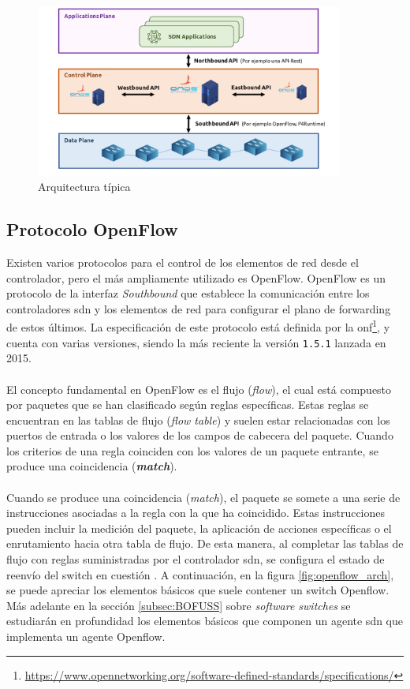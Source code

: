 \begin{figure}[ht]
    \centering
    \includegraphics[width=0.9\textwidth]{archivos/img/teoria/sdn_arch.png}
    \caption{Arquitectura típica  \cite{carrascal2020diseno}}
    \label{fig:sdnBasicArch}
\end{figure}


\subsection{Protocolo OpenFlow}

Existen varios protocolos para el control de los elementos de red desde el controlador, pero el más ampliamente utilizado es OpenFlow. OpenFlow es un protocolo de la interfaz \textit{Southbound} que establece la comunicación entre los controladores \gls{sdn} y los elementos de red para configurar el plano de forwarding de estos últimos. La especificación de este protocolo está definida por la \gls{onf}\footnote{\url{https://www.opennetworking.org/software-defined-standards/specifications/}}, y cuenta con varias versiones, siendo la más reciente la versión \texttt{1.5.1} lanzada en 2015.\\
\\
El concepto fundamental en OpenFlow es el flujo (\textit{flow}), el cual está compuesto por paquetes que se han clasificado según reglas específicas. Estas reglas se encuentran en las tablas de flujo (\textit{flow table}) y suelen estar relacionadas con los puertos de entrada o los valores de los campos de cabecera del paquete. Cuando los criterios de una regla coinciden con los valores de un paquete entrante, se produce una coincidencia (\textbf{\textit{match}}).\\
\\
Cuando se produce una coincidencia (\textit{match}), el paquete se somete a una serie de instrucciones asociadas a la regla con la que ha coincidido. Estas instrucciones pueden incluir la medición del paquete, la aplicación de acciones específicas o el enrutamiento hacia otra tabla de flujo. De esta manera, al completar las tablas de flujo con reglas suministradas por el controlador \gls{sdn}, se configura el estado de reenvío del switch en cuestión \cite{nadeau2013sdn}. A continuación, en la figura \ref{fig:openflow_arch}, se puede apreciar los elementos básicos que suele contener un switch Openflow. Más adelante en la sección \ref{subsec:BOFUSS} sobre \textit{software switches} se estudiarán en profundidad los elementos básicos que componen un agente \gls{sdn} que implementa un agente Openflow.


